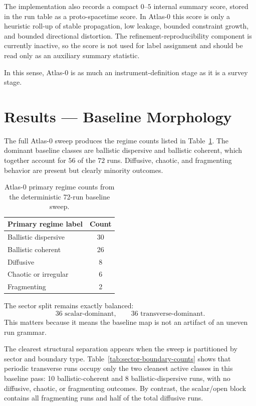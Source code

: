 \documentclass[11pt]{article}
\begin{document}
The implementation also records a compact $0$--$5$ internal summary score, stored in the run table as a proto-spacetime score. In Atlas-0 this score is only a heuristic roll-up of stable propagation, low leakage, bounded constraint growth, and bounded directional distortion. The refinement-reproducibility component is currently inactive, so the score is not used for label assignment and should be read only as an auxiliary summary statistic.

In this sense, Atlas-0 is as much an instrument-definition stage as it is a survey stage.

\section{Results --- Baseline Morphology}
The full Atlas-0 sweep produces the regime counts listed in Table~\ref{tab:regime-counts}. The dominant baseline classes are ballistic dispersive and ballistic coherent, which together account for $56$ of the $72$ runs. Diffusive, chaotic, and fragmenting behavior are present but clearly minority outcomes.

\begin{table}[t]
\centering
\begin{tabular}{lc}
\hline
Primary regime label & Count \\
\hline
Ballistic dispersive & 30 \\
Ballistic coherent & 26 \\
Diffusive & 8 \\
Chaotic or irregular & 6 \\
Fragmenting & 2 \\
\hline
\end{tabular}
\caption{Atlas-0 primary regime counts from the deterministic 72-run baseline sweep.}
\label{tab:regime-counts}
\end{table}

The sector split remains exactly balanced:
\begin{equation}
36 \text{ scalar-dominant}, \qquad 36 \text{ transverse-dominant}.
\end{equation}
This matters because it means the baseline map is not an artifact of an uneven run grammar.

The clearest structural separation appears when the sweep is partitioned by sector and boundary type. Table~\ref{tab:sector-boundary-counts} shows that periodic transverse runs occupy only the two cleanest active classes in this baseline pass: 10 ballistic-coherent and 8 ballistic-dispersive runs, with no diffusive, chaotic, or fragmenting outcomes. By contrast, the scalar/open block contains all fragmenting runs and half of the total diffusive runs.
\end{document}
